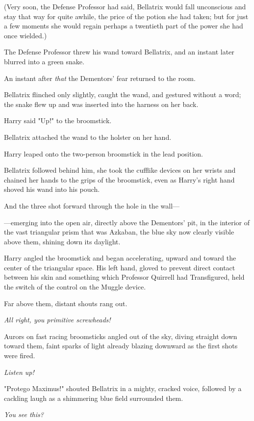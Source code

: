(Very soon, the Defense Professor had said, Bellatrix would fall unconscious 
and stay that way for quite awhile, the price of the potion she had taken; but 
for just a few moments she would regain perhaps a twentieth part of the power 
she had once wielded.)

The Defense Professor threw his wand toward Bellatrix, and an instant later 
blurred into a green snake.

An instant after \emph{that} the Dementors' fear returned to the room.

Bellatrix flinched only slightly, caught the wand, and gestured without a word; 
the snake flew up and was inserted into the harness on her back.

Harry said "Up!" to the broomstick.

Bellatrix attached the wand to the holster on her hand.

Harry leaped onto the two-person broomstick in the lead position.

Bellatrix followed behind him, she took the cufflike devices on her wrists and 
chained her hands to the grips of the broomstick, even as Harry's right hand 
shoved his wand into his pouch.

And the three shot forward through the hole in the wall---

---emerging into the open air, directly above the Dementors' pit, in the 
interior of the vast triangular prism that was Azkaban, the blue sky now 
clearly visible above them, shining down its daylight.

Harry angled the broomstick and began accelerating, upward and toward the 
center of the triangular space. His left hand, gloved to prevent direct contact 
between his skin and something which Professor Quirrell had Transfigured, held 
the switch of the control on the Muggle device.

Far above them, distant shouts rang out.

\emph{All right, you primitive screwheads!}

Aurors on fast racing broomsticks angled out of the sky, diving straight down 
toward them, faint sparks of light already blazing downward as the first shots 
were fired.

\emph{Listen up!\\
}

"Protego Maximus!" shouted Bellatrix in a mighty, cracked voice, followed by a 
cackling laugh as a shimmering blue field surrounded them.

\emph{You see this?}


